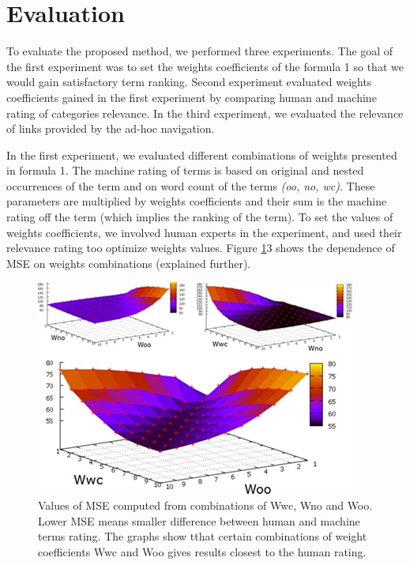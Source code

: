 \documentclass{llncs}%
\begin{document}
\section{Evaluation}

To evaluate the proposed method, we performed three experiments. The goal of the first experiment was to set the weights coefficients of the formula 1 so that we would gain satisfactory term ranking. Second experiment evaluated weights coefficients gained in the first experiment by comparing human and machine rating of categories relevance. In the third experiment, we evaluated the relevance of links provided by the ad-hoc navigation. 

In the first experiment, we evaluated different combinations of weights presented in formula 1. The machine rating of terms is based on original and nested occurrences of the term and on word count of the terms \textit{(oo, no, wc)}. These parameters are multiplied by weights coefficients and their sum is the machine rating off the term (which implies the ranking of the term). To set the values of weights coefficients, we involved human experts in the experiment, and used their relevance rating too optimize weights values. Figure \ref{fig3}3 shows the dependence of MSE on weights combinations 
(explained further). 

\begin{figure}[ht]
\centering
\includegraphics[width =\textwidth]{Images/obr3.png}
\caption{Values of MSE computed from combinations of Wwc, Wno and Woo. Lower MSE means smaller difference between human and machine terms rating. The graphs show tthat certain combinations of weight coefficients Wwc and Woo gives results closest to the human rating. }
\label{fig3}
\end{figure}
\end{document}
